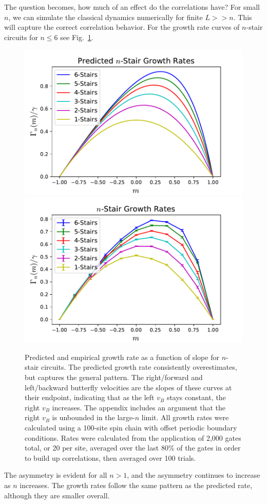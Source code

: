 \documentclass[aps,prx,reprint,superscriptaddress, longbibliography]{revtex4-1}
\begin{document}
The question becomes, how much of an effect do the correlations have? 
For small $n$, we can simulate the classical dynamics numerically for finite $L>>n$. This will capture the correct correlation behavior. For the growth rate curves of $n$-stair circuits for $n\le 6$ see Fig.~\ref{fig:compareRates}. 
\begin{figure}
	\includegraphics[width=\columnwidth]{predicRates.pdf}
	\includegraphics[width=\columnwidth]{compareRates.pdf}
	\caption{Predicted and empirical growth rate as a function of slope for $n$-stair circuits. The predicted growth rate consistently overestimates, but captures the general pattern. The right/forward and left/backward butterfly velocities are the slopes of these curves at their endpoint, indicating that as the left $v_B$ stays constant, the right $v_B$ increases. The appendix includes an argument that the right $v_B$ is unbounded in the large-$n$ limit. All growth rates were calculated using a 100-site spin chain with offset periodic boundary conditions. Rates were calculated from the application of 2,000 gates total, or 20 per site, averaged over the last 80\% of the gates in order to build up correlations, then averaged over 100 trials.}
	\label{fig:compareRates}
\end{figure}
The asymmetry is evident for all $n>1$, and the asymmetry continues to increase as $n$ increases. The growth rates follow the same pattern as the predicted rate, although they are smaller overall. 
\end{document}
